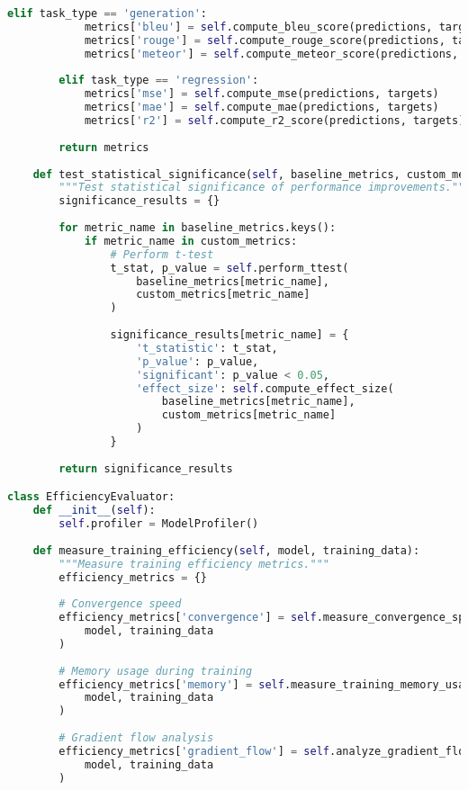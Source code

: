 \begin{lstlisting}[language=Python, caption=Comprehensive evaluation framework for custom tokens]
        elif task_type == 'generation':
            metrics['bleu'] = self.compute_bleu_score(predictions, targets)
            metrics['rouge'] = self.compute_rouge_score(predictions, targets)
            metrics['meteor'] = self.compute_meteor_score(predictions, targets)
            
        elif task_type == 'regression':
            metrics['mse'] = self.compute_mse(predictions, targets)
            metrics['mae'] = self.compute_mae(predictions, targets)
            metrics['r2'] = self.compute_r2_score(predictions, targets)
        
        return metrics
    
    def test_statistical_significance(self, baseline_metrics, custom_metrics):
        """Test statistical significance of performance improvements."""
        significance_results = {}
        
        for metric_name in baseline_metrics.keys():
            if metric_name in custom_metrics:
                # Perform t-test
                t_stat, p_value = self.perform_ttest(
                    baseline_metrics[metric_name],
                    custom_metrics[metric_name]
                )
                
                significance_results[metric_name] = {
                    't_statistic': t_stat,
                    'p_value': p_value,
                    'significant': p_value < 0.05,
                    'effect_size': self.compute_effect_size(
                        baseline_metrics[metric_name],
                        custom_metrics[metric_name]
                    )
                }
        
        return significance_results

class EfficiencyEvaluator:
    def __init__(self):
        self.profiler = ModelProfiler()
        
    def measure_training_efficiency(self, model, training_data):
        """Measure training efficiency metrics."""
        efficiency_metrics = {}
        
        # Convergence speed
        efficiency_metrics['convergence'] = self.measure_convergence_speed(
            model, training_data
        )
        
        # Memory usage during training
        efficiency_metrics['memory'] = self.measure_training_memory_usage(
            model, training_data
        )
        
        # Gradient flow analysis
        efficiency_metrics['gradient_flow'] = self.analyze_gradient_flow(
            model, training_data
        )
        

\end{lstlisting}
